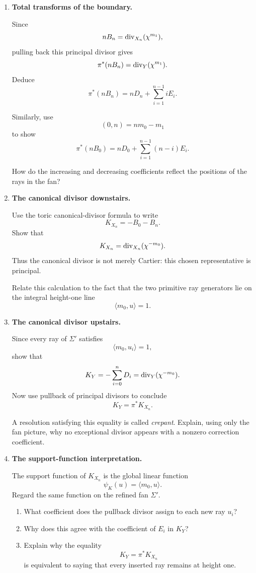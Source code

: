 \begin{enumerate}[label=\textbf{Hint \arabic*.},wide=0pt]
Write the corresponding local character equations and check their
compatibility on overlaps.

\item \textbf{Total transforms of the boundary.}

Since
\[
nB_n
=
\operatorname{div}_{X_n}(\chi^{m_1}),
\]
pulling back this principal divisor gives
\[
\pi^*(nB_n)
=
\operatorname{div}_Y(\chi^{m_1}).
\]
Deduce
\[
\boxed{
\pi^*(nB_n)
=
nD_n+\sum_{i=1}^{n-1}iE_i.
}
\]

Similarly, use
\[
(0,n)=nm_0-m_1
\]
to show
\[
\boxed{
\pi^*(nB_0)
=
nD_0+\sum_{i=1}^{n-1}(n-i)E_i.
}
\]

How do the increasing and decreasing coefficients reflect the
positions of the rays in the fan?

\item \textbf{The canonical divisor downstairs.}

Use the toric canonical-divisor formula to write
\[
K_{X_n}=-B_0-B_n.
\]
Show that
\[
K_{X_n}
=
\operatorname{div}_{X_n}(\chi^{-m_0}).
\]
Thus the canonical divisor is not merely Cartier: this chosen
representative is principal.

Relate this calculation to the fact that the two primitive ray
generators lie on the integral height-one line
\[
\langle m_0,u\rangle=1.
\]

\item \textbf{The canonical divisor upstairs.}

Since every ray of \(\Sigma'\) satisfies
\[
\langle m_0,u_i\rangle=1,
\]
show that
\[
K_Y
=
-\sum_{i=0}^{n}D_i
=
\operatorname{div}_Y(\chi^{-m_0}).
\]
Now use pullback of principal divisors to conclude
\[
\boxed{
K_Y=\pi^*K_{X_n}.
}
\]

A resolution satisfying this equality is called \emph{crepant}.
Explain, using only the fan picture, why no exceptional divisor
appears with a nonzero correction coefficient.

\item \textbf{The support-function interpretation.}

The support function of \(K_{X_n}\) is the global linear function
\[
\psi_K(u)=\langle m_0,u\rangle.
\]
Regard the same function on the refined fan \(\Sigma'\).

\begin{enumerate}[label=(\alph*),wide=0pt]
\item What coefficient does the pullback divisor assign to each new
ray \(u_i\)?
\item Why does this agree with the coefficient of \(E_i\) in \(K_Y\)?
\item Explain why the equality
\[
K_Y=\pi^*K_{X_n}
\]
is equivalent to saying that every inserted ray remains at height
one.
\end{enumerate}


\end{enumerate}
